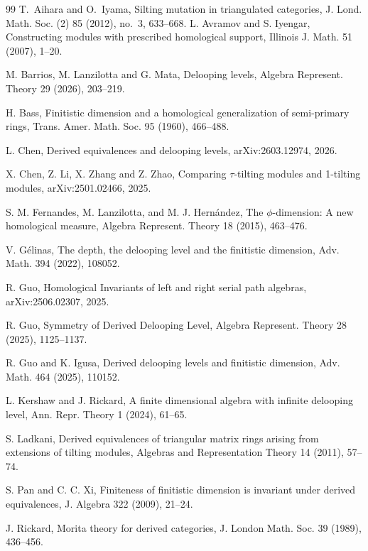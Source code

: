 \documentclass[12pt,a4paper,reqno]{amsart}
\theoremstyle{plain}
\theoremstyle{definition}
\theoremstyle{remark}
\begin{document}
\raggedbottom
\begin{thebibliography}{99}
  T.~Aihara and O.~Iyama, Silting mutation in triangulated categories, J. Lond. Math. Soc. (2)  85 (2012), no.~3,
633--668.
 L. Avramov and S. Iyengar, Constructing modules with prescribed homological support, Illinois J. Math. 51 (2007), 1--20.

 M. Barrios, M. Lanzilotta and G. Mata, Delooping levels, Algebra Represent. Theory 29 (2026), 203--219.

 H. Bass, Finitistic dimension and a homological generalization of semi-primary rings, Trans. Amer. Math. Soc. 95 (1960), 466--488.

 L. Chen, Derived equivalences and delooping levels, arXiv:2603.12974, 2026.

 X. Chen, Z. Li, X. Zhang and Z. Zhao, Comparing $\tau$-tilting modules and 1-tilting modules, arXiv:2501.02466, 2025.

 S. M. Fernandes, M. Lanzilotta, and M. J. Hern{\'a}ndez, The $\phi$-dimension: A new homological measure, Algebra Represent. Theory 18 (2015), 463--476.

 V. G\'{e}linas, The depth, the delooping level and the finitistic dimension, Adv. Math. 394 (2022), 108052.

 R. Guo, Homological Invariants of left and right serial path algebras, arXiv:2506.02307, 2025.

 R. Guo, Symmetry of Derived Delooping Level, Algebra Represent. Theory 28 (2025), 1125--1137.

 R. Guo and K. Igusa, Derived delooping levels and finitistic dimension, Adv. Math. 464 (2025), 110152.

 L. Kershaw and J. Rickard, A finite dimensional algebra with infinite delooping level, Ann. Repr. Theory 1 (2024), 61--65.

 S. Ladkani, Derived equivalences of triangular matrix rings arising from extensions of tilting modules, Algebras and Representation Theory 14 (2011), 57--74.

 S. Pan and C. C. Xi, Finiteness of finitistic dimension is invariant under derived equivalences, J. Algebra 322 (2009), 21--24.

 J. Rickard, Morita theory for derived categories, J. London Math. Soc. 39 (1989), 436--456.


\end{thebibliography}
\end{document}
